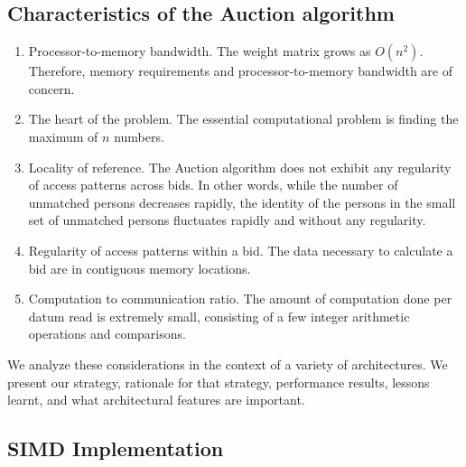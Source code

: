 \subsection{Characteristics of the Auction algorithm}
\label{auction_charac}

\begin{enumerate}
\item Processor-to-memory bandwidth.
The weight matrix grows as $O(n^2)$.  Therefore, memory requirements
and processor-to-memory bandwidth are of concern.

\item The heart of the problem.
The essential computational problem is finding the maximum of $n$ numbers. 

\item Locality of reference. The Auction algorithm does not
exhibit any regularity of access patterns across bids. In
other words, while the number of unmatched persons decreases
rapidly, the identity of the persons in the small set of 
unmatched persons fluctuates rapidly and without any regularity.

\item Regularity of access patterns within a bid.
The data necessary to calculate a bid are in contiguous memory locations.

\item Computation to communication ratio. The amount of
computation done per datum read is extremely small, consisting
of a few integer arithmetic operations and comparisons.

\end{enumerate}

We analyze these considerations in the context of 
a variety of architectures. We present our strategy, rationale
for that strategy, performance results, lessons learnt, and
what architectural features are important.


\subsection{SIMD Implementation}
\label{simd}

